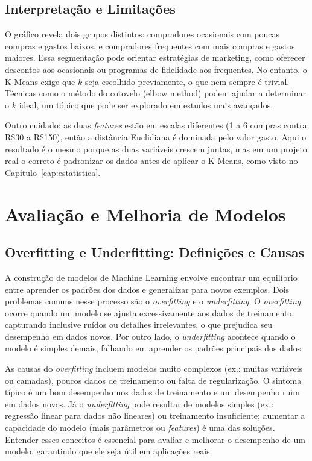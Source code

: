 \documentclass[a4paper,12pt,openany]{book}
\begin{document}
\section{Interpretação e Limitações}

O gráfico revela dois grupos distintos: compradores ocasionais com poucas compras e gastos baixos, e compradores frequentes com mais compras e gastos maiores. Essa segmentação pode orientar estratégias de marketing, como oferecer descontos aos ocasionais ou programas de fidelidade aos frequentes. No entanto, o K-Means exige que \(k\) seja escolhido previamente, o que nem sempre é trivial. Técnicas como o método do cotovelo (elbow method) podem ajudar a determinar o \(k\) ideal, um tópico que pode ser explorado em estudos mais avançados.

Outro cuidado: as duas \textit{features} estão em escalas diferentes (1 a 6 compras contra R\$30 a R\$150), então a distância Euclidiana é dominada pelo valor gasto. Aqui o resultado é o mesmo porque as duas variáveis crescem juntas, mas em um projeto real o correto é padronizar os dados antes de aplicar o K-Means, como visto no Capítulo~\ref{cap:estatistica}.

\newpage

\chapter{Avaliação e Melhoria de Modelos}\label{cap:avaliacao}

\section{Overfitting e Underfitting: Definições e Causas}

A construção de modelos de Machine Learning envolve encontrar um equilíbrio entre aprender os padrões dos dados e generalizar para novos exemplos. Dois problemas comuns nesse processo são o \textit{overfitting} e o \textit{underfitting}. O \textit{overfitting} ocorre quando um modelo se ajusta excessivamente aos dados de treinamento, capturando inclusive ruídos ou detalhes irrelevantes, o que prejudica seu desempenho em dados novos. Por outro lado, o \textit{underfitting} acontece quando o modelo é simples demais, falhando em aprender os padrões principais dos dados.

As causas do \textit{overfitting} incluem modelos muito complexos (ex.: muitas variáveis ou camadas), poucos dados de treinamento ou falta de regularização. O sintoma típico é um bom desempenho nos dados de treinamento e um desempenho ruim em dados novos. Já o \textit{underfitting} pode resultar de modelos simples (ex.: regressão linear para dados não lineares) ou treinamento insuficiente; aumentar a capacidade do modelo (mais parâmetros ou \textit{features}) é uma das soluções. Entender esses conceitos é essencial para avaliar e melhorar o desempenho de um modelo, garantindo que ele seja útil em aplicações reais.
\end{document}
